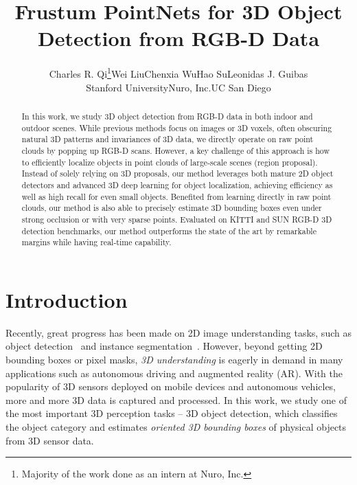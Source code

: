 \documentclass[10pt,twocolumn,letterpaper]{article}
\begin{document}
\title{Frustum PointNets for 3D Object Detection from RGB-D Data}

\author{Charles R. Qi\thanks{Majority of the work done as an intern at Nuro, Inc.}\qquad Wei Liu\qquad Chenxia Wu\qquad Hao Su\qquad Leonidas J. Guibas\\
Stanford University\qquad Nuro, Inc.\qquad UC San Diego}

\maketitle


\begin{abstract}
  




In this work, we study 3D object detection from RGB-D data in both indoor and outdoor scenes. While previous methods focus on images or 3D voxels, often obscuring natural 3D patterns and invariances of 3D data, we directly operate on raw point clouds by popping up RGB-D scans. However, a key challenge of this approach is how to efficiently localize objects in point clouds of large-scale scenes (region proposal). Instead of solely relying on 3D proposals, our method leverages both mature 2D object detectors and advanced 3D deep learning for object localization, achieving efficiency as well as high recall for even small objects. Benefited from learning directly in raw point clouds, our method is also able to precisely estimate 3D bounding boxes even under strong occlusion or with very sparse points. Evaluated on KITTI and SUN RGB-D 3D detection benchmarks, our method outperforms the state of the art by remarkable margins while having real-time capability.
 \end{abstract}

\section{Introduction}
\label{sec:intro}




Recently, great progress has been made on 2D image understanding tasks, such as object detection~\cite{girshick2014rich} and instance segmentation~\cite{he2017mask}. However, beyond getting 2D bounding boxes or pixel masks, \emph{3D understanding} is eagerly in demand in many applications such as autonomous driving and augmented reality (AR). With the popularity of 3D sensors deployed on mobile devices and autonomous vehicles, more and more 3D data is captured and processed. In this work, we study one of the most important 3D perception tasks -- 3D object detection, which classifies the object category and estimates \emph{oriented 3D bounding boxes} of physical objects from 3D sensor data. 
\end{document}
